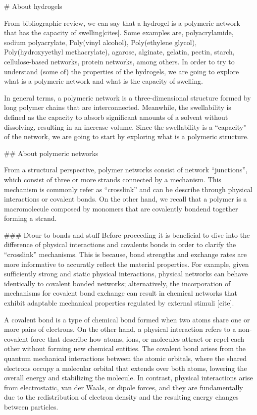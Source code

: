 # About hydrogels

From bibliographic review, we can say that a hydrogel is a polymeric network that has the capacity of swelling[cites].
Some examples are,
    polyacrylamide,
    sodium polyacrylate,
    Poly(vinyl alcohol),
    Poly(ethylene glycol),
    Poly(hydroxyyethyl methacrylate),
    agarose,
    alginate,
    gelatin,
    pectin,
    starch,
    cellulose-based networks,
    protein networks,
    among others.
In order to try to understand (some of) the properties of the hydrogels, we are going to explore what is a polymeric network and what is the capacity of swelling.

In general terms, a polymeric network is a three-dimensional structure formed by long polymer chains that are interconnected.
Meanwhile, the swellability is defined as the capacity to absorb significant amounts of a solvent without dissolving, resulting in an increase volume.
Since the swellability is a ``capacity'' of the network, we are going to start by exploring what is a polymeric structure.

## About polymeric networks

From a structural perspective, polymer networks consist of network ``junctions'', which consist of three or more strands connected by a mechanism. 
This mechanism is commonly refer as ``crosslink'' and can be describe through physical interactions or covalent bonds.
On the other hand, we recall that a polymer is a macromolecule composed by monomers that are covalently bondend together forming a strand.

### Dtour to bonds and stuff
Before proceeding it is beneficial to dive into the difference of physical interactions and covalents bonds in order to clarify the ``crosslink'' mechanisms.
This is because, bond strengths and exchange rates are more informative to accuratly reflect the material properties.
For example, given sufficiently strong and static physical interactions, physical networks can behave identically to covalent bonded networks; 
alternatively, the incorporation of mechanisms for covalent bond exchange can result in chemical networks that exhibit adaptable mechanical properties regulated by external stimuli [cite]. 

A covalent bond is a type of chemical bond formed when two atoms share one or more pairs of electrons. 
On the other hand, a physical interaction refers to a non-covalent force that describe how atoms, ions, or molecules attract or repel each other without forming new chemical entities. 
The covalent bond arises from the quantum mechanical interactions between the atomic orbitals, where the shared electrons occupy a molecular orbital that extends over both atoms, lowering the overall energy and stabilizing the molecule.
In contrast, physical interactions arise from electrostatic, van der Waals, or dipole forces, and they are fundamentally due to the redistribution of electron density and the resulting energy changes between particles.


